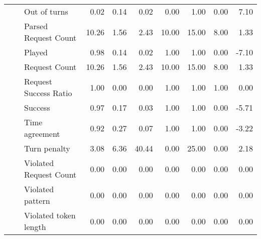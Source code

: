 \begin{tabular}{lllrrrrrrr}
 &  & Out of turns & 0.02 & 0.14 & 0.02 & 0.00 & 1.00 & 0.00 & 7.10 \\
 &  & Parsed Request Count & 10.26 & 1.56 & 2.43 & 10.00 & 15.00 & 8.00 & 1.33 \\
 &  & Played & 0.98 & 0.14 & 0.02 & 1.00 & 1.00 & 0.00 & -7.10 \\
 &  & Request Count & 10.26 & 1.56 & 2.43 & 10.00 & 15.00 & 8.00 & 1.33 \\
 &  & Request Success Ratio & 1.00 & 0.00 & 0.00 & 1.00 & 1.00 & 1.00 & 0.00 \\
 &  & Success & 0.97 & 0.17 & 0.03 & 1.00 & 1.00 & 0.00 & -5.71 \\
 &  & Time agreement & 0.92 & 0.27 & 0.07 & 1.00 & 1.00 & 0.00 & -3.22 \\
 &  & Turn penalty & 3.08 & 6.36 & 40.44 & 0.00 & 25.00 & 0.00 & 2.18 \\
 &  & Violated Request Count & 0.00 & 0.00 & 0.00 & 0.00 & 0.00 & 0.00 & 0.00 \\
 &  & Violated pattern & 0.00 & 0.00 & 0.00 & 0.00 & 0.00 & 0.00 & 0.00 \\
 &  & Violated token length & 0.00 & 0.00 & 0.00 & 0.00 & 0.00 & 0.00 & 0.00 \\
\cline{1-10} \cline{2-10}
\bottomrule
\end{tabular}
